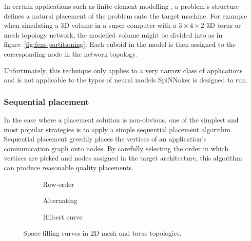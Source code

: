 				In certain applications such as finite element modelling
				\cite{bermejo13}, a problem's structure defines a natural placement of
				the problem onto the target machine. For example when simulating a 3D
				volume in a super computer with a $3 \times 4 \times 2$ 3D torus or
				mesh topology network, the modelled volume might be divided into as in
				figure~\ref{fig:fem-partitioning}. Each cuboid in the model is then
				assigned to the corresponding node in the network topology.
				
				Unfortunately, this technique only applies to a very narrow class of
				applications and is not applicable to the types of neural models
				SpiNNaker is designed to run.
			
			\subsubsection{Sequential placement}
				
				In the case where a placement solution is non-obvious, one of the
				simplest and most popular strategies is to apply a simple sequential
				placement algorithm. Sequential placement greedily places the vertices
				of an application's communication graph onto nodes. By carefully
				selecting the order in which vertices are picked and nodes assigned in
				the target architecture, this algorithm can produce reasonable quality
				placements.
				
				\begin{figure}
					\center
					\begin{subfigure}{0.32\linewidth}
						\center
						\caption{Row-order}
						\label{fig:sequential-row-order}
					\end{subfigure}
					\begin{subfigure}{0.32\linewidth}
						\center
						\caption{Alternating}
						\label{fig:sequential-alternating}
					\end{subfigure}
					\begin{subfigure}{0.32\linewidth}
						\center
						\caption{Hilbert curve}
						\label{fig:sequential-hilbert}
					\end{subfigure}
					
					\caption{Space-filling curves in 2D mesh and torus topologies.}
					\label{fig:sequential}
				\end{figure}
				
